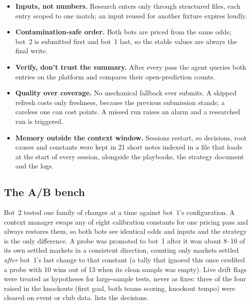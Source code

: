 \documentclass[11pt]{article}
\begin{document}
\begin{itemize}[leftmargin=*]
  \item \textbf{Inputs, not numbers.} Research enters only through structured files, each entry
        scoped to one match; an input reused for another fixture expires loudly.
  \item \textbf{Contamination-safe order.} Both bots are priced from the same odds; bot~2 is
        submitted first and bot~1 last, so the stable values are always the final write.
  \item \textbf{Verify, don't trust the summary.} After every pass the agent queries both entries
        on the platform and compares their open-prediction counts.
  \item \textbf{Quality over coverage.} No mechanical fallback ever submits. A skipped refresh
        costs only freshness, because the previous submission stands; a careless one can cost
        points. A missed run raises an alarm and a researched run is triggered.
  \item \textbf{Memory outside the context window.} Sessions restart, so decisions, root causes
        and constants were kept in 21 short notes indexed in a file that loads at the start of
        every session, alongside the playbooks, the strategy document and the logs.
\end{itemize}

\subsection{The A/B bench}\label{sec:ab}

Bot~2 tested one family of changes at a time against bot~1's configuration. A context manager
swaps any of eight calibration constants for one pricing pass and always restores them, so both
bots see identical odds and inputs and the strategy is the only difference. A probe was
promoted to bot~1 after it won about 8--10 of its own settled markets in a consistent
direction, counting only markets settled \emph{after} bot~1's last change to that constant (a
tally that ignored this once credited a probe with 10 wins out of 13 when its clean sample was
empty). Live drift flags were treated as hypotheses for large-sample tests, never as fixes:
three of the four raised in the knockouts (first goal, both teams scoring, knockout tempo) were
cleared on event or club data.  lists the decisions.
\end{document}
